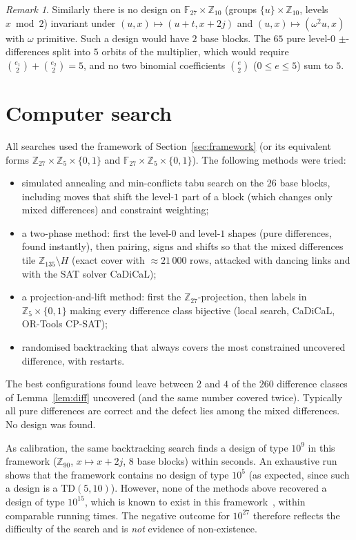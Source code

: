 \documentclass[11pt]{article}
\theoremstyle{remark}
\newtheorem{remark}[theorem]{Remark}
\newcommand{\Z}{\mathbb{Z}}
\newcommand{\F}{\mathbb{F}}
\begin{document}
\begin{remark}
Similarly there is no design on $\F_{27}\times\Z_{10}$ (groups $\{u\}\times\Z_{10}$, levels $x \bmod 2$)
invariant under $(u,x)\mapsto(u+t,x+2j)$ and $(u,x)\mapsto(\omega^2u,x)$ with $\omega$ primitive.
Such a design would have $2$ base blocks.  The $65$ pure level-$0$ $\pm$-differences split into
$5$ orbits of the multiplier, which would require $\binom{e_1}{2}+\binom{e_2}{2}=5$, and no two
binomial coefficients $\binom{e}{2}$ ($0\le e\le 5$) sum to $5$.
\end{remark}

\section{Computer search}\label{sec:search}

All searches used the framework of Section~\ref{sec:framework} (or its equivalent forms
$\Z_{27}\times\Z_5\times\{0,1\}$ and $\F_{27}\times\Z_5\times\{0,1\}$).  The following methods were tried:
\begin{itemize}
\item simulated annealing and min-conflicts tabu search on the $26$ base blocks, including moves that
  shift the level-$1$ part of a block (which changes only mixed differences) and constraint weighting;
\item a two-phase method: first the level-$0$ and level-$1$ shapes (pure differences, found instantly),
  then pairing, signs and shifts so that the mixed differences tile $\Z_{135}\setminus H$
  (exact cover with $\approx 21\,000$ rows, attacked with dancing links and with the SAT solver CaDiCaL);
\item a projection-and-lift method: first the $\Z_{27}$-projection, then labels in $\Z_5\times\{0,1\}$
  making every difference class bijective (local search, CaDiCaL, OR-Tools CP-SAT);
\item randomised backtracking that always covers the most constrained uncovered difference, with restarts.
\end{itemize}

The best configurations found leave between $2$ and $4$ of the $260$ difference classes of
Lemma~\ref{lem:diff} uncovered (and the same number covered twice).  Typically all pure differences
are correct and the defect lies among the mixed differences.  No design was found.

As calibration, the same backtracking search finds a design of type $10^9$ in this framework
($\Z_{90}$, $x\mapsto x+2j$, $8$ base blocks) within seconds.  An exhaustive run shows that the
framework contains no design of type $10^5$ (as expected, since such a design is a
$\mathrm{TD}(5,10)$).  However, none of the methods above recovered a design of type $10^{15}$, which is
known to exist in this framework~\cite{Forbes2023}, within comparable running times.  The negative
outcome for $10^{27}$ therefore reflects the difficulty of the search and is \emph{not} evidence of
non-existence.
\end{document}
